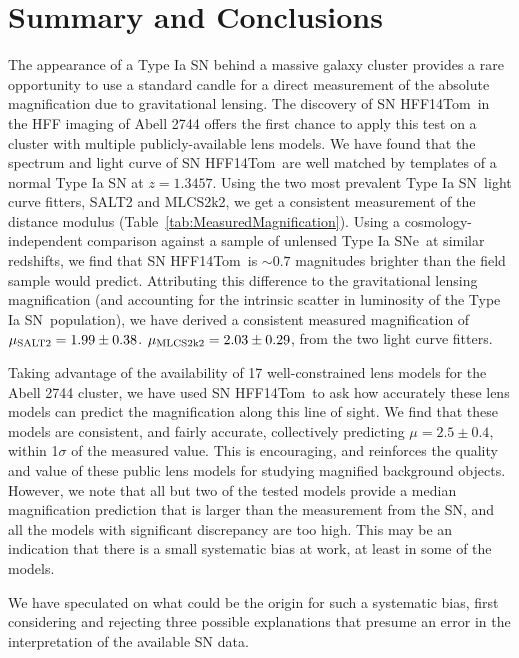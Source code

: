 \documentclass[iop]{emulateapj}
\def\tomas{HFF14Tom}
\newcommand{\SNIa}{Type Ia SN}
\newcommand{\SNeIa}{Type Ia SNe}
\begin{document}
\section{Summary and Conclusions}
\label{sec:SummaryAndConclusions}

The appearance of a Type Ia SN behind a massive galaxy cluster
provides a rare opportunity to use a standard candle for a direct
measurement of the absolute magnification due to gravitational
lensing.  The discovery of SN \tomas\ in the HFF imaging of Abell 2744
offers the first chance to apply this test on a cluster with multiple
publicly-available lens models.  We have found that the spectrum and
light curve of SN \tomas\ are well matched by templates of a normal
Type Ia SN at $z=1.3457$.  Using the two most prevalent \SNIa\ light
curve fitters, SALT2 and MLCS2k2, we get a consistent measurement of
the distance modulus (Table~\ref{tab:MeasuredMagnification}).  Using a
cosmology-independent comparison against a sample of unlensed \SNeIa\
at similar redshifts, we find that SN \tomas\ is $\sim0.7$ magnitudes
brighter than the field sample would predict.  Attributing this
difference to the gravitational lensing magnification (and accounting
for the intrinsic scatter in luminosity of the \SNIa\ population), we
have derived a consistent measured magnification of $\mu_{\rm
SALT2}=1.99\pm0.38$.  $\mu_{\rm MLCS2k2}=2.03\pm0.29$, from the two
light curve fitters.

Taking advantage of the availability of 17 well-constrained lens
models for the Abell 2744 cluster, we have used SN \tomas\ to ask how
accurately these lens models can predict the magnification along this
line of sight.  We find that these models are consistent, and fairly
accurate, collectively predicting $\mu=2.5\pm0.4$, within 1$\sigma$ of
the measured value.  This is encouraging, and reinforces the quality
and value of these public lens models for studying magnified
background objects.  However, we note that all but two of the tested
models provide a median magnification prediction that is larger than
the measurement from the SN, and all the models with significant
discrepancy are too high.  This may be an indication that there is a
small systematic bias at work, at least in some of the models. 

We have speculated on what could be the origin for such a systematic
bias, first considering and rejecting three possible explanations that
presume an error in the interpretation of the available SN data.
\end{document}
